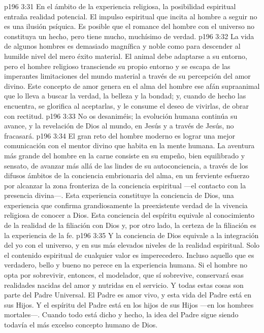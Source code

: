 \vs p196 3:31 \pc En el ámbito de la experiencia religiosa, la posibilidad espiritual entraña realidad potencial. El impulso espiritual que incita al hombre a seguir no es una ilusión psíquica. Es posible que el romance del hombre con el universo no constituya un hecho, pero tiene mucho, muchísimo de verdad.
\vs p196 3:32 La vida de algunos hombres es demasiado magnífica y noble como para descender al humilde nivel del mero éxito material. El animal debe adaptarse a su entorno, pero el hombre religioso transciende su propio entorno y se escapa de las imperantes limitaciones del mundo material a través de su percepción del amor divino. Este concepto de amor genera en el alma del hombre ese afán supraanimal que lo lleva a buscar la verdad, la belleza y la bondad; y, cuando de hecho las encuentra, se glorifica al aceptarlas, y le consume el deseo de vivirlas, de obrar con rectitud.
\vs p196 3:33 No os desaniméis; la evolución humana continúa su avance, y la revelación de Dios al mundo, en Jesús y a través de Jesús, no fracasará.
\vs p196 3:34 El gran reto del hombre moderno es lograr una mejor comunicación con el mentor divino que habita en la mente humana. La aventura más grande del hombre en la carne consiste en su empeño, bien equilibrado y sensato, de avanzar más allá de las lindes de su autoconciencia, a través de los difusos ámbitos de la conciencia embrionaria del alma, en un ferviente esfuerzo por alcanzar la zona fronteriza de la conciencia espiritual ---el contacto con la presencia divina---. Esta experiencia constituye la conciencia de Dios, una experiencia que confirma grandiosamente la preexistente verdad de la vivencia religiosa de conocer a Dios. Esta conciencia del espíritu equivale al conocimiento de la realidad de la filiación con Dios y, por otro lado, la certeza de la filiación es la experiencia de la fe.
\vs p196 3:35 Y la conciencia de Dios equivale a la integración del yo con el universo, y en sus más elevados niveles de la realidad espiritual. Solo el contenido espiritual de cualquier valor es imperecedero. Incluso aquello que es verdadero, bello y bueno no perece en la experiencia humana. Si el hombre no opta por sobrevivir, entonces, el modelador, que sí sobrevive, conservará esas realidades nacidas del amor y nutridas en el servicio. Y todas estas cosas son parte del Padre Universal. El Padre es amor vivo, y esta vida del Padre está en sus Hijos. Y el espíritu del Padre está en los hijos de sus Hijos ---en los hombres mortales---. Cuando todo está dicho y hecho, la idea del Padre sigue siendo todavía el más excelso concepto humano de Dios.
\separatorline
